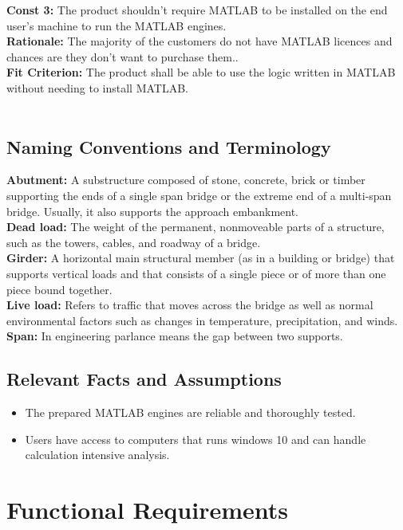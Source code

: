 \documentclass[12pt]{article}
\begin{document}
    \textbf{Const 3:} The product shouldn't require MATLAB to be installed on the end user’s machine to run the MATLAB engines. \\
    \textbf{Rationale:} The majority of the customers do not have MATLAB licences and chances are they don’t want to purchase them..\\
    \textbf{Fit Criterion:} The product shall be able to use the logic written in MATLAB without needing to install MATLAB.\\\\

\subsection{Naming Conventions and Terminology}
\textbf{Abutment:} A substructure composed of stone, concrete, brick or timber supporting the ends of a single span bridge or the extreme end of a multi-span bridge. Usually, it also supports the approach embankment.\\
\textbf{Dead load:} The weight of the permanent, nonmoveable parts of a structure, such as the towers, cables, and roadway of a bridge.\\
\textbf{Girder:} A horizontal main structural member (as in a building or bridge) that supports vertical loads and that consists of a single piece or of more than one piece bound together.\\
\textbf{Live load:} Refers to traffic that moves across the bridge as well as normal environmental factors such as changes in temperature, precipitation, and winds.\\
\textbf{Span:} In engineering parlance means the gap between two supports.

\subsection{Relevant Facts and Assumptions}
\begin{itemize}
  \item The prepared MATLAB engines are reliable and thoroughly tested.
  \item Users have access to computers that runs windows 10 and can handle calculation intensive analysis.
\end{itemize}


\section{Functional Requirements}
\end{document}
